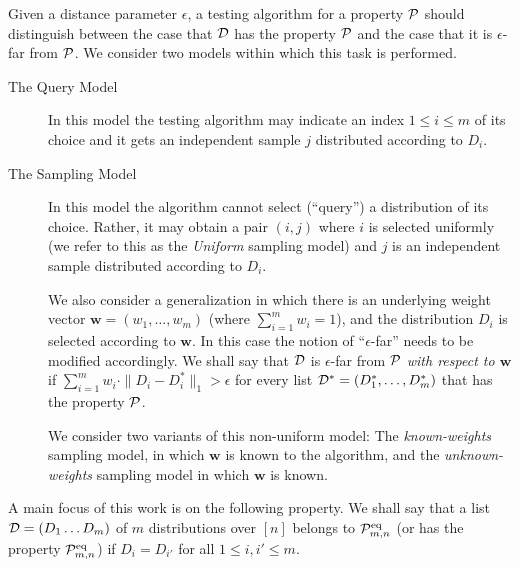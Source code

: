 \documentclass[10pt]{article}
\theoremstyle{definition}
\numberwithin{equation}{section}
\newcommand{\eps}{\epsilon}
\newcommand{\calD}{{\cal D}}
\newcommand{\calP}{{\cal P}}
\newcommand{\wbf}{{\mathbf w}}
\newcommand{\calPidmn}{{\cal P}^{\rm eq}_{m,n}}
\begin{document}
Given a distance parameter $\eps$,
a testing algorithm for a property $\calP$
%
should distinguish between the case that $\calD$ has the property
$\calP$ and the case that it is $\eps$-far from $\calP$. We consider
two models within which this task is performed.
\begin{description}
\item[The Query Model]
In this model the testing algorithm may indicate an index $1 \leq i \leq m$ of
its choice and it gets an independent sample $j$ distributed according to $D_i$.
\item[The Sampling Model]
In this model the algorithm cannot select (``query'') a distribution of
its choice. Rather, it may obtain a pair $(i,j)$ where $i$ is selected
uniformly (we refer to this as the \emph{Uniform} sampling model)
and $j$ is an independent sample distributed according to $D_i$.

We also consider a generalization in which there is an underlying
weight vector $\wbf = (w_1,\ldots,w_m)$ (where $\sum_{i=1}^m w_i = 1$),
and the distribution $D_i$ is selected according to $\wbf$.
In this case the notion of ``$\eps$-far'' %
needs to be modified accordingly.
%
We shall say  %
that $\calD$ is $\eps$-far from $\calP$ \emph{with respect to $\wbf$}
if $\sum_{i=1}^m w_i\cdot \|D_i - D^*_i\|_1 > \eps $
for every list $\calD^* = (D^*_1,\ldots,D^*_m)$
that has the property $\calP$.

We consider two variants of this non-uniform model:
The \emph{known-weights} sampling model, in which $\wbf$ is known
to the algorithm, and the \emph{unknown-weights} sampling model
in which $\wbf$ is known.
%
%
%
%
%
\end{description}

%
%
%
%
%
%

A main focus of this work is on the following property.
We shall say that a list $\calD = (D_1 \ldots D_m)$ of $m$ distributions over $[n]$
belongs to $\calPidmn$ (or has the property $\calPidmn$) if $D_i = D_{i'}$ for all
$1 \leq i, i' \leq m$.
\end{document}
